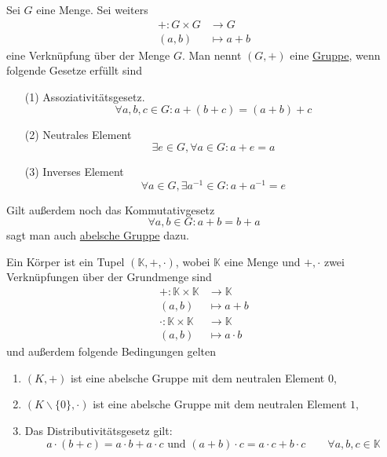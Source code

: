\begin{definition}
    [Gruppe] Sei $G$ eine Menge. Sei weiters
    \begin{align*}
        +: G\times G &\to G\\
        (a,b)&\mapsto a + b
    \end{align*}
    eine Verknüpfung über der Menge $G$. Man nennt $(G,+)$ eine \underline{Gruppe}, wenn folgende Gesetze erfüllt sind
    \begin{enumerate}
        \item[(1)] Assoziativitätsgesetz.
        \[
            \forall a,b,c\in G : a + (b + c) = (a + b) + c
        \]
        \item[(2)] Neutrales Element
        \[
            \exists e \in G, \forall a\in G : a + e = a
        \]
        \item[(3)] Inverses Element 
        \[
            \forall a \in G, \exists a^{-1}\in G : a + a^{-1} = e
        \]
    \end{enumerate}
    Gilt außerdem noch das Kommutativgesetz
    \[
        \forall a,b\in G : a + b = b + a
    \]
    sagt man auch \underline{abelsche Gruppe} dazu.
\end{definition}
\begin{definition}
    [Körper] Ein Körper ist ein Tupel $(\mathbb{K}, +, \cdot)$, wobei $\mathbb{K}$ eine Menge und $+,\cdot$ zwei Verknüpfungen über
    der Grundmenge sind
    \begin{align*}
        + : \mathbb{K} \times \mathbb{K} &\to \mathbb{K}\\
        (a,b) &\mapsto a + b\\
        \cdot : \mathbb{K} \times \mathbb{K} &\to \mathbb{K}\\
        (a,b)&\mapsto a\cdot b
    \end{align*}
    und außerdem folgende Bedingungen gelten
    \begin{enumerate}
        \item $(K,+)$ ist eine abelsche Gruppe mit dem neutralen Element $0$,
        \item $(K\backslash\{0\}, \cdot)$ ist eine abelsche Gruppe mit dem neutralen Element $1$,
        \item Das Distributivitätsgesetz gilt:
        \[
            a \cdot (b + c) =  a\cdot b + a\cdot c\text{ und } (a + b) \cdot c = a\cdot c + b\cdot c\qquad\forall a,b,c\in\mathbb{K}
        \]
    \end{enumerate}
\end{definition}
